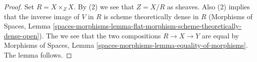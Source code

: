\documentclass{stacks-project}
\theoremstyle{plain}
\theoremstyle{definition}
\theoremstyle{remark}
\numberwithin{equation}{subsection}
\begin{document}
\begin{proof}
Set $R = X \times_Z X$. By (2) we see that $Z = X/R$ as sheaves.
Also (2) implies that the inverse image of $V$ in $R$ is scheme
theoretically dense in $R$ (Morphisms of Spaces, Lemma
\ref{spaces-morphisms-lemma-flat-morphism-scheme-theoretically-dense-open}).
The we see that the two compositions
$R \to X \to Y$ are equal by Morphisms of Spaces, Lemma
\ref{spaces-morphisms-lemma-equality-of-morphisms}.
The lemma follows.
\end{proof}
\end{document}
